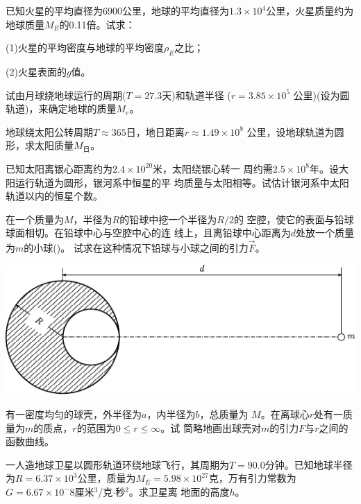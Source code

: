 \begin{exercises}
\exercise 已知火星的平均直径为6900公里，地球的平均直径为$ 1.3
\times 1 0 ^ { 4 }   $公里，火星质量约为地球质量$  M _ { E }   $的0.11倍。试求：

(1)火星的平均密度与地球的平均密度$ \rho _ E $之比；

(2)火星表面的$ g $值。

\exercise 试由月球绕地球运行的周期($  T = 2 7 . 3   $天)和轨道半径
($  r = 3 . 8 5 \times 1 0 ^ { 5 } $ 公里)(设为圆轨道)，来确定地球的质量$ M _ e $。

\exercise 地球绕太阳公转周期$  T \approx 3 6 5   $日，地日距离$  r \approx 1 . 4 9 \times 1 0 ^ { 8 }  $
公里，设地球轨道为圆形，求太阳质量$ M _ \text{日} $。

\exercise 已知太阳离银心距离约为$  2 . 4 \times 1 0 ^ { 2 0 }   $米，太阳绕银心转一
周约需$  2 . 5 \times 1 0 ^ { 8 }   $年。设大阳运行轨道为圆形，银河系中恒星的平
均质量与太阳相等。试估计银河系中太阳轨道以内的恒星个数。

\exercise 在一个质量为$ M $，半径为$ R $的铅球中挖一个半径为$ R/2 $的
空腔，使它的表面与铅球球面相切。在铅球中心与空腔中心的连
线上，且离铅球中心距离为$ d $处放一个质量为$ m $的小球()。
试求在这种情况下铅球与小球之间的引力$ \vec{F} $。
\begin{figurex}
    \centering
    \includegraphics{figure/fig04.12}
    \caption{}
    \label{fig:04.12}
\end{figurex}

\exercise 有一密度均匀的球壳，外半径为$ a $，内半径为$ b $，总质量为
$ M $。在离球心$ r $处有一质量为$ m $的质点，$ r $的范围为$  0 \leqslant r \leqslant \infty   $。试
筒略地画出球壳对$ m $的引力$ F $与$ r $之间的函数曲线。

\exercise 一人造地球卫星以圆形轨道环绕地球飞行，其周期为$  T =
90.0 $分钟。已知地球半径为$  R = 6. 3 7 \times 1 0 ^ { 3 }   $公里，质量为$  M _ { E } = 5 . 9 8
\times 1 0 ^ { 2 7 }   $克，万有引力常数为$  G = 6 . 6 7 \times 1 0 ^ { - }  8 $厘米$ ^3 $/克$ \cdot $秒$ ^2 $。求卫星离
地面的高度$ h $。


\end{exercises}
